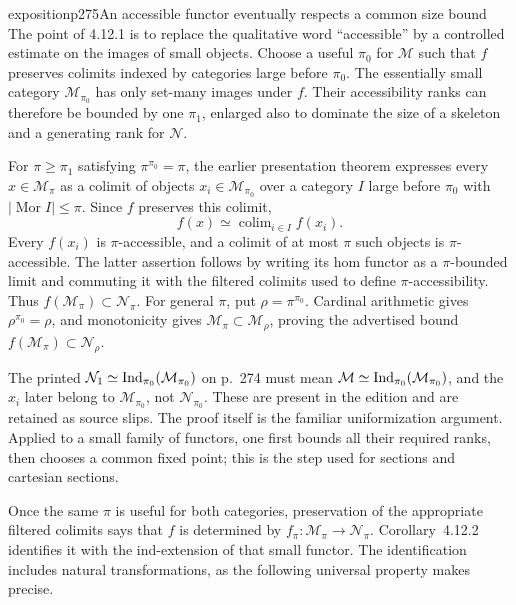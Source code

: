 \begin{dcomment}{exposition}{p275}{An accessible functor eventually respects a common size bound}
The point of 4.12.1 is to replace the qualitative word ``accessible'' by a controlled estimate on the images of small objects. Choose a useful $\pi_0$ for $\mathcal M$ such that $f$ preserves colimits indexed by categories large before $\pi_0$. The essentially small category $\mathcal M_{\pi_0}$ has only set-many images under $f$. Their accessibility ranks can therefore be bounded by one $\pi_1$, enlarged also to dominate the size of a skeleton and a generating rank for $\mathcal N$.

For $\pi\geq\pi_1$ satisfying $\pi^{\pi_0}=\pi$, the earlier presentation theorem expresses every $x\in\mathcal M_\pi$ as a colimit of objects $x_i\in\mathcal M_{\pi_0}$ over a category $I$ large before $\pi_0$ with $|\operatorname{Mor}I|\leq\pi$. Since $f$ preserves this colimit,
\[
 f(x)\simeq\operatorname{colim}_{i\in I}f(x_i).
\]
Every $f(x_i)$ is $\pi$-accessible, and a colimit of at most $\pi$ such objects is $\pi$-accessible. The latter assertion follows by writing its hom functor as a $\pi$-bounded limit and commuting it with the filtered colimits used to define $\pi$-accessibility. Thus $f(\mathcal M_\pi)\subset\mathcal N_\pi$. For general $\pi$, put $\rho=\pi^{\pi_0}$. Cardinal arithmetic gives $\rho^{\pi_0}=\rho$, and monotonicity gives $\mathcal M_\pi\subset\mathcal M_\rho$, proving the advertised bound $f(\mathcal M_\pi)\subset\mathcal N_\rho$.

The printed $\mathcal N_1\simeq\mathrm{Ind}_{\pi_0}(\mathcal M_{\pi_0})$ on p.~274 must mean $\mathcal M\simeq\mathrm{Ind}_{\pi_0}(\mathcal M_{\pi_0})$, and the $x_i$ later belong to $\mathcal M_{\pi_0}$, not $\mathcal N_{\pi_0}$. These are present in the edition and are retained as source slips. The proof itself is the familiar uniformization argument. Applied to a small family of functors, one first bounds all their required ranks, then chooses a common fixed point; this is the step used for sections and cartesian sections.

Once the same $\pi$ is useful for both categories, preservation of the appropriate filtered colimits says that $f$ is determined by $f_\pi:\mathcal M_\pi\to\mathcal N_\pi$. Corollary~4.12.2 identifies it with the ind-extension of that small functor. The identification includes natural transformations, as the following universal property makes precise.
\end{dcomment}


